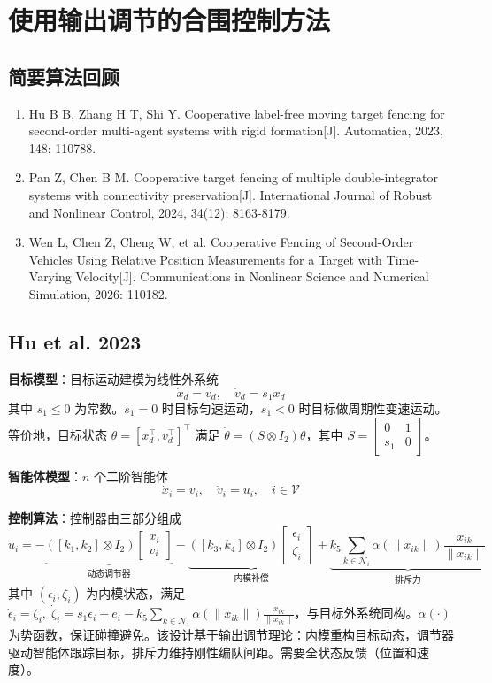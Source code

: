 
\section{使用输出调节的合围控制方法}

\subsection{简要算法回顾}

\begin{enumerate}
  \item Hu B B, Zhang H T, Shi Y. Cooperative label-free moving target fencing for second-order multi-agent systems with rigid formation[J]. Automatica, 2023, 148: 110788.
  \item Pan Z, Chen B M. Cooperative target fencing of multiple double-integrator systems with connectivity preservation[J]. International Journal of Robust and Nonlinear Control, 2024, 34(12): 8163-8179.
  \item Wen L, Chen Z, Cheng W, et al. Cooperative Fencing of Second-Order Vehicles Using Relative Position Measurements for a Target with Time-Varying Velocity[J]. Communications in Nonlinear Science and Numerical Simulation, 2026: 110182.
\end{enumerate}

\subsection{Hu et al. 2023}

\textbf{目标模型}：目标运动建模为线性外系统
\[
\dot{x}_d = v_d, \quad \dot{v}_d = s_1 x_d
\]
其中 $s_1 \leq 0$ 为常数。$s_1 = 0$ 时目标匀速运动，$s_1 < 0$ 时目标做周期性变速运动。等价地，目标状态 $\theta = [x_d^\top, v_d^\top]^\top$ 满足 $\dot{\theta} = (S \otimes I_2)\theta$，其中 $S = \begin{bmatrix} 0 & 1 \\ s_1 & 0 \end{bmatrix}$。

\textbf{智能体模型}：$n$ 个二阶智能体
\[
\dot{x}_i = v_i, \quad \dot{v}_i = u_i, \quad i \in \mathcal{V}
\]

\textbf{控制算法}：控制器由三部分组成
\[
u_i = -\underbrace{([k_1, k_2] \otimes I_2)\begin{bmatrix} x_i \\ v_i \end{bmatrix}}_{\text{动态调节器}} - \underbrace{([k_3, k_4] \otimes I_2)\begin{bmatrix} \epsilon_i \\ \zeta_i \end{bmatrix}}_{\text{内模补偿}} + \underbrace{k_5 \sum_{k \in \mathcal{N}_i} \alpha(\|x_{ik}\|) \frac{x_{ik}}{\|x_{ik}\|}}_{\text{排斥力}}
\]
其中 $(\epsilon_i, \zeta_i)$ 为内模状态，满足 $\dot{\epsilon}_i = \zeta_i,\; \dot{\zeta}_i = s_1 \epsilon_i+e_i - k_5 \sum_{k \in \mathcal{N}_i} \alpha(\|x_{ik}\|) \frac{x_{ik}}{\|x_{ik}\|}$，与目标外系统同构。$\alpha(\cdot)$ 为势函数，保证碰撞避免。该设计基于输出调节理论：内模重构目标动态，调节器驱动智能体跟踪目标，排斥力维持刚性编队间距。需要全状态反馈（位置和速度）。

